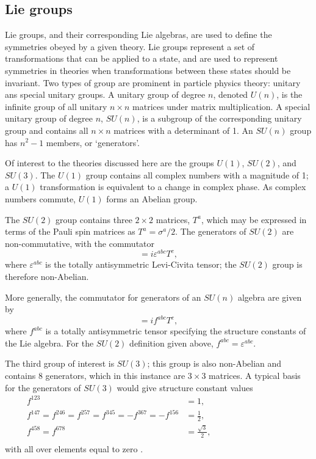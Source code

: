 
\subsection{Lie groups}

Lie groups, and their corresponding Lie algebras, are used to define the
symmetries obeyed by a given theory. Lie groups represent a set of
transformations that can be applied to a state, and are used to represent
symmetries in theories when transformations between these states should be
invariant.  Two types of group are prominent in particle physics theory: unitary
ans special unitary groups.  A unitary group of degree $n$, denoted $U(n)$, is
the infinite group of all unitary $n\times n$ matrices under matrix
multiplication.  A special unitary group of degree $n$, $SU(n)$, is a subgroup
of the corresponding unitary group and contains all $n\times n$ matrices with a
determinant of 1. An $SU(n)$ group has $n^2-1$ members, or `generators'.

Of interest to the theories discussed here are the groups $U(1)$, $SU(2)$, and
$SU(3)$. The $U(1)$ group contains all complex numbers with a magnitude of 1; a
$U(1)$ transformation is equivalent to a change in complex phase. As complex
numbers commute, $U(1)$ forms an Abelian group.

The $SU(2)$ group contains three $2\times 2$ matrices, $T^a$, which may be
expressed in terms of the Pauli spin matrices as $T^a = \sigma^a/2$. The
generators of $SU(2)$ are non-commutative, with the commutator
\begin{equation*}
  [T^a,T^b] = i \varepsilon^{abc} T^c,
\end{equation*}
where $\varepsilon^{abc}$ is the totally antisymmetric Levi-Civita tensor;
the $SU(2)$ group is therefore non-Abelian.

More generally, the commutator for generators of an $SU(n)$ algebra are given by
\begin{equation}
  [T^a,T^b] = if^{abc}T^{c},
  \label{eqn:theory-symmetry-gen-commutator}
\end{equation}
where $f^{abc}$ is a totally antisymmetric tensor specifying the structure
constants of the Lie algebra. For the $SU(2)$ definition given above,
$f^{abc}=\varepsilon^{abc}$.

The third group of interest is $SU(3)$; this group is also non-Abelian and
contains 8 generators, which in this instance are $3\times 3$ matrices. A
typical basis for the generators of $SU(3)$ would give structure constant values
\begin{equation*}
  \begin{split}
    f^{123} &= 1, \\
    f^{147} = f^{246} = f^{257} = f^{345} = -f^{367} = -f^{156} &= \frac12,
    \hspace{10em}\\
    f^{458} = f^{678} &= \frac{\sqrt{3}}2, \\
  \end{split}
\end{equation*}
%
with all over elements equal to zero \cite{gellmann1961}.

